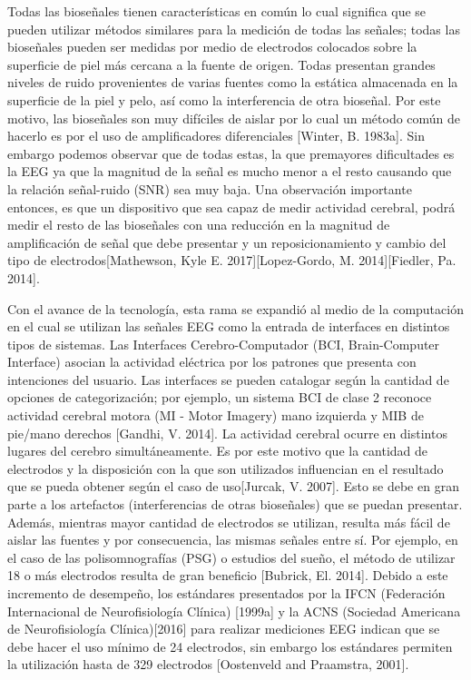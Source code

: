 Todas las bioseñales tienen características en común lo cual significa que se pueden utilizar métodos similares para la medición de todas las señales; todas las bioseñales pueden ser medidas por medio de electrodos colocados sobre la superficie de piel más cercana a la fuente de origen. Todas presentan grandes niveles de ruido provenientes de varias fuentes como la estática almacenada en la superficie de la piel y pelo, así como la interferencia de otra bioseñal. Por este motivo, las bioseñales son muy difíciles de aislar por lo cual un método común de hacerlo es por el uso de amplificadores diferenciales [Winter, B. 1983a]. Sin embargo podemos observar que de todas estas, la que pre\senta mayores dificultades es la EEG ya que la magnitud de la señal es mucho menor a el resto causando que la relación señal-ruido (SNR) sea muy baja. Una observación importante entonces, es que un dispositivo que sea capaz de medir actividad cerebral, podrá medir el resto de las bioseñales con una reducción en la magnitud de amplificación de señal que debe presentar y un reposicionamiento y cambio del tipo de electrodos[Mathewson, Kyle E. 2017][Lopez-Gordo, M. 2014][Fiedler, Pa. 2014].

Con el avance de la tecnología, esta rama se expandió al medio de la computación en el cual se utilizan las señales EEG como la entrada de interfaces en distintos tipos de sistemas. Las Interfaces Cerebro-Computador (BCI, Brain-Computer Interface) asocian la actividad eléctrica por los patrones que presenta con intenciones del usuario. Las interfaces se pueden catalogar según la cantidad de opciones de categorización; por ejemplo, un sistema BCI de clase 2 reconoce actividad cerebral motora (MI - Motor Imagery) mano izquierda y MIB de pie/mano derechos [Gandhi, V. 2014]. La actividad cerebral ocurre en distintos lugares del cerebro simultáneamente. Es por este motivo que la cantidad de electrodos y la disposición con la que son utilizados influencian en el resultado que se pueda obtener según el caso de uso[Jurcak, V. 2007]. Esto se debe en gran parte a los artefactos (interferencias de otras bioseñales) que se puedan presentar. Además, mientras mayor cantidad de electrodos se utilizan, resulta más fácil de aislar las fuentes y por consecuencia, las mismas señales entre sí. Por ejemplo, en el caso de las polisomnografías (PSG) o estudios del sueño, el método de utilizar 18 o más electrodos resulta de gran beneficio [Bubrick, El. 2014]. Debido a este incremento de desempeño, los estándares presentados por la IFCN (Federación Internacional de Neurofisiología Clínica) [1999a] y la ACNS (Sociedad Americana de Neurofisiología Clínica)[2016] para realizar mediciones EEG indican que se debe hacer el uso mínimo de 24 electrodos, sin embargo los estándares permiten la utilización hasta de 329 electrodos [Oostenveld and Praamstra, 2001].
